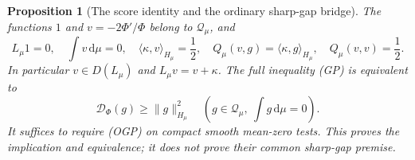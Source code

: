 \documentclass[11pt]{article}
\newtheorem{proposition}[theorem]{Proposition}
\theoremstyle{remark}\newtheorem{remark}[theorem]{Remark}
\newcommand{\dd}{\,\mathrm d}
\begin{document}
\begin{proposition}[The score identity and the ordinary sharp-gap bridge]
\label{prop:theta-ordinary-gap}
The functions $1$ and $v=-2\Phi'/\Phi$ belong to $\mathcal Q_\mu$,
and
\[
 L_\mu1=0,\quad \int v\dd\mu=0,\quad
 \langle\kappa,v\rangle_{H_\mu}=\frac12,\quad
 Q_\mu(v,g)=\langle\kappa,g\rangle_{H_\mu},\quad
 Q_\mu(v,v)=\frac12.                                      \tag{SCI}
\]
In particular $v\in D(L_\mu)$ and $L_\mu v=v+\kappa$.
The full inequality (GP) is equivalent to
\[
 \mathcal D_\Phi(g)\ge\|g\|_{H_\mu}^2
 \quad\left(g\in\mathcal Q_\mu,\ \int g\dd\mu=0\right).
                                                               \tag{OGP}
\]
It suffices to require (OGP) on compact smooth mean-zero tests.
This proves the implication and equivalence; it does not prove
their common sharp-gap premise.
\end{proposition}
\end{document}
